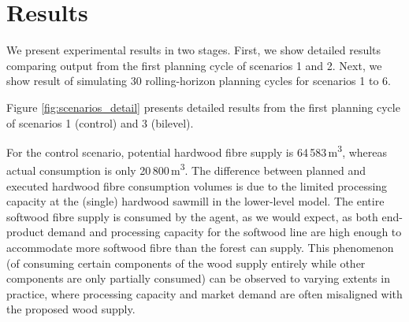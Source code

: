 



\section{Results}
\label{sec:results2}

We present experimental results in two stages. First, we show detailed results comparing output from the first planning cycle of scenarios 1 and 2. Next, we show result of simulating 30 rolling-horizon planning cycles for scenarios 1 to 6.

Figure \ref{fig:scenarios_detail} presents detailed results from the first planning cycle of scenarios 1 (control) and 3 (bilevel).
 
For the control scenario, potential hardwood fibre supply is 64\,583\,\si{\cubic\metre}, whereas actual consumption is only 20\,800\,\si{\cubic\metre}.
The difference between planned and executed hardwood fibre consumption volumes is due to the limited processing capacity at the (single) hardwood sawmill in the lower-level model.
The entire softwood fibre supply is consumed by the agent, as we would expect, as both end-product demand and processing capacity for the softwood line are high enough to accommodate more softwood fibre than the forest can supply. 
This phenomenon (of consuming certain components of the wood supply entirely while other components are only partially consumed) can be observed to varying extents in practice, where processing capacity and market demand are often misaligned with the proposed wood supply.

